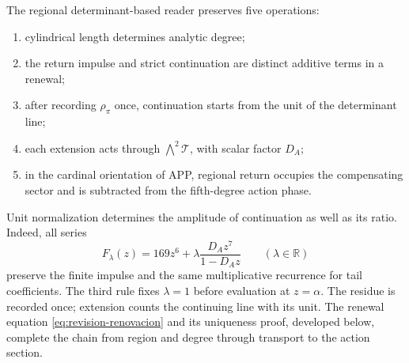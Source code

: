 \begin{definition}
\label{def:accion-lector-regional}
The regional determinant-based reader preserves five operations:
\begin{enumerate}
 \item cylindrical length determines analytic degree;
 \item the return impulse and strict continuation are distinct additive
 terms in a renewal;
 \item after recording \(\rho_\pi\) once, continuation starts from
 the unit of the determinant line;
 \item each extension acts through \(\bigwedge^2\mathcal T\), with
 scalar factor \(D_A\);
 \item in the cardinal orientation of APP, regional return occupies the
 compensating sector and is subtracted from the fifth-degree action phase.
\end{enumerate}
\end{definition}

Unit normalization determines the amplitude of continuation as well as
its ratio. Indeed, all series
\[
 F_\lambda(z)=169z^6+\lambda\frac{D_Az^7}{1-D_Az}
 \qquad(\lambda\in\mathbb R)
\]
preserve the finite impulse and the same multiplicative recurrence for
tail coefficients. The third rule fixes \(\lambda=1\) before
evaluation at \(z=\alpha\). The residue is recorded once; extension
counts the continuing line with its unit. The renewal equation
\eqref{eq:revision-renovacion} and its uniqueness proof, developed below,
complete the chain from region and degree through transport to the
action section.
